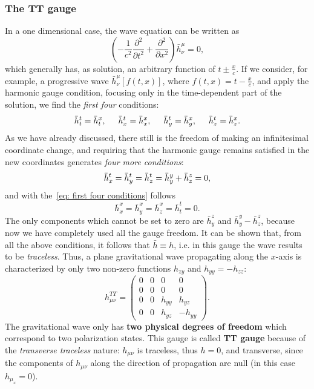 \subsubsection{The TT gauge}
In a one dimensional case, the wave equation can be written as
\[
    \left( -\frac{1}{c^2} \frac{\partial^2}{\partial t^2}  + \frac{\partial^2}{\partial x^2}\right)\bar{h}^\mu_\nu = 0,
\]
which generally has, as solution, an arbitrary function of $t\pm \frac{x}{c}$.
If we consider, for example, a progressive wave $\bar{h}^\mu_\nu [f(t,x)]$, where $f(t,x) = t- \frac{x}{c}$, and apply the harmonic gauge condition, focusing only in the time-dependent part of the solution, we find the \textit{first four} conditions:
\begin{equation}
    \bar{h}^t_t = \bar{h}^x_t, \hspace{5mm} \bar{h}^t_x = \bar{h}^x_x, \hspace{5mm} \bar{h}^t_y = \bar{h}^x_y, \hspace{5mm} \bar{h}^t_z = \bar{h}^x_z.
    \label{eq: first four conditions}
\end{equation}
As we have already discussed, there still is the freedom of making an infinitesimal coordinate change, and requiring that the harmonic gauge remains satisfied in the new coordinates generates \textit{four more conditions}:
\begin{equation}
    \bar{h}^t_x = \bar{h}^t_y = \bar{h}^t_z = \bar{h}^y_y + \bar{h}^z_z = 0,
    \notag
\end{equation}
and with the~\eqref{eq: first four conditions} follows
\[
     \bar{h}^x_x = \bar{h}^x_y = \bar{h}^x_z = \bar{h}^t_t = 0.
\]
The only components which cannot be set to zero are $\bar{h}^z_y$ and $\bar{h}^y_y - \bar{h}^z_z$, because now we have completely used all the gauge freedom.
It can be shown that, from all the above conditions, it follows that $\bar{h} \equiv h$, i.e. in this gauge the wave results to be \textit{traceless}.
Thus, a plane gravitational wave propagating along the $x$-axis is characterized by only two non-zero functions $h_{zy}$ and $h_{yy}=-h_{zz}$:
\begin{equation}
    h^{TT}_{\mu\nu} =  
    \begin{pmatrix}
0 & 0 & 0 & 0 \\
0 & 0 & 0 & 0 \\
0 & 0 & h_{yy} & h_{yz} \\
0 & 0 & h_{yz} & -h_{yy}
\end{pmatrix}.
    \label{eq: h as a matrix in x case}
\end{equation}
The gravitational wave only has \textbf{two physical degrees of freedom} which correspond to two polarization states.
This gauge is called \textbf{TT gauge} because of the \textit{transverse traceless} nature: $h_{\mu\nu}$ is traceless, thus $h=0$, and transverse, since the components of $h_{\mu\nu}$ along the direction of propagation are null (in this case $h_{\mu_x}=0$).

